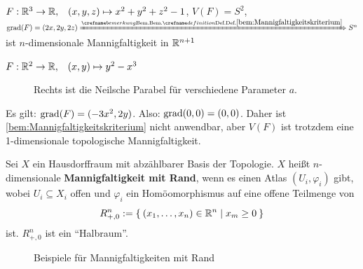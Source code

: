 \begin{beispiel}%
    \begin{bspenum}
        \item $F: \mathbb{R}^3 \rightarrow \mathbb{R},\;\;\; (x, y, z) \mapsto x^2 + y^2 + z^2 - 1$,
              $V(F) = S^2$, $\grad(F) = (2x, 2y, 2z) \xRightarrow{\crefabbr{bem:Mannigfaltigkeitskriterium}} S^n$
              ist $n$-dimensionale Mannigfaltigkeit in $\mathbb{R}^{n+1}$
        \item $F: \mathbb{R}^2 \rightarrow \mathbb{R}, \;\;\; (x,y) \mapsto y^2 - x^3$
            \begin{figure}[ht]
                \centering
                \subfloat[$F(x,y) = y^2 - x^3$]{
                    \resizebox{0.45\linewidth}{!}{}
                    \label{fig:semicubical-parabola-2d}
                }%
                \subfloat[$y^2 - ax^3 = 0$]{
                    \resizebox{0.45\linewidth}{!}{}
                    \label{fig:semicubical-parabola-3d}
                }%
                \label{Neilsche-Parabel}
                \caption{Rechts ist die Neilsche Parabel für verschiedene Parameter $a$.}
            \end{figure}
              Es gilt: $\operatorname{grad}(F) = (-3x^2, 2y)$. Also: $\operatorname{grad}(0,0) = (0,0)$.
              Daher ist \cref{bem:Mannigfaltigkeitskriterium}
              nicht anwendbar, aber $V(F)$ ist trotzdem
              eine 1-dimensionale topologische Mannigfaltigkeit.
    \end{bspenum}
\end{beispiel}

\begin{definition}%
    Sei $X$ ein Hausdorffraum mit abzählbarer Basis der Topologie.
    $X$ heißt $n$-dimensionale \textbf{Mannigfaltigkeit mit Rand},
    wenn es einen Atlas $(U_i, \varphi_i)$ gibt, wobei $U_i \subseteq X_i$
    offen und $\varphi_i$ ein Homöomorphismus auf eine offene 
    Teilmenge von 
    \[R_{+,0}^n := \Set{(x_1, \dots, x_n) \in \ensuremath{\mathbb{R}}^n | x_m \geq 0}\]
    ist. $R_{+,0}^n$ ist ein \enquote{Halbraum}.
\end{definition}

\begin{figure}[ht]
    \centering
    \subfloat[Halbraum]{
        
        \label{fig:half-space}
    }%

    \label{Mannigfaltigkeiten mit Rand}
    \caption{Beispiele für Mannigfaltigkeiten mit Rand}
\end{figure}

